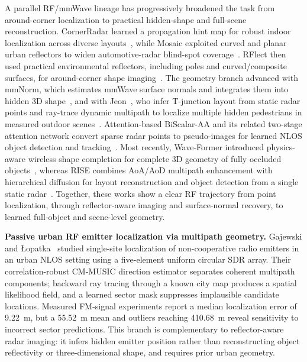 A parallel RF/mmWave lineage has progressively broadened the task from around-corner localization to practical hidden-shape and full-scene reconstruction. CornerRadar learned a propagation hint map for robust indoor localization across diverse layouts~\cite{yueCornerRadar2022}, while Mosaic exploited curved and planar urban reflectors to widen automotive-radar blind-spot coverage~\cite{woodfordMosaic2022}. RFlect then used practical environmental reflectors, including poles and curved/composite surfaces, for around-corner shape imaging~\cite{doddsRFlect2024}. The geometry branch advanced with mmNorm, which estimates mmWave surface normals and integrates them into hidden 3D shape~\cite{doddsMmNorm2025}, and with Jeon~\etal, who infer T-junction layout from static radar points and ray-trace dynamic multipath to localize multiple hidden pedestrians in measured outdoor scenes~\cite{jeonTJunctionMmWaveNLOS2025}. Attention-based BiScalar-AA and its related two-stage attention network convert sparse radar points to pseudo-images for learned NLOS object detection and tracking~\cite{yuBiScalarAA2025,yuTSANNLOS2025}. Most recently, Wave-Former introduced physics-aware wireless shape completion for complete 3D geometry of fully occluded objects~\cite{doddsWaveFormer2026}, whereas RISE combines AoA/AoD multipath enhancement with hierarchical diffusion for layout reconstruction and object detection from a single static radar~\cite{zhouRISE2026}. Together, these works show a clear RF trajectory from point localization, through reflector-aware imaging and surface-normal recovery, to learned full-object and scene-level geometry.

\vspace{0.8mm}
\noindent \textbf{Passive urban RF emitter localization via multipath geometry.}
Gajewski and {\L}opatka~\cite{gajewskiUrbanRFLocalization2026} studied single-site localization of non-cooperative radio emitters in an urban NLOS setting using a five-element uniform circular SDR array. Their correlation-robust CM-MUSIC direction estimator separates coherent multipath components; backward ray tracing through a known city map produces a spatial likelihood field, and a learned sector mask suppresses implausible candidate locations. Measured FM-signal experiments report a median localization error of 9.22~m, but a 55.52~m mean and outliers reaching 410.68~m reveal sensitivity to incorrect sector predictions. This branch is complementary to reflector-aware radar imaging: it infers hidden emitter position rather than reconstructing object reflectivity or three-dimensional shape, and requires prior urban geometry.

